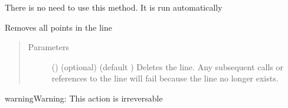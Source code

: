 \documentclass[letterpaper,10pt,english]{sphinxmanual}
\begin{document}
\begin{fulllineitems}


{\hyperref[\detokenize{pypoints:pypoints.HLine}]{}}



\begin{fulllineitems}
\label{\detokenize{pypoints:pypoints.VLine.build}}
There is no need to use this method. It is run automatically

\end{fulllineitems}


\begin{fulllineitems}
\label{\detokenize{pypoints:pypoints.VLine.remove}}
Removes all points in the line
\begin{quote}\begin{description}
\item[{Parameters}] \leavevmode
{} () \textendash{} (optional) (default ) Deletes the line. Any subsequent calls or references to the line will fail because the line no longer exists.

\end{description}\end{quote}

\begin{sphinxadmonition}{warning}{Warning:}
This action is irreversable
\end{sphinxadmonition}







\end{fulllineitems}


\end{fulllineitems}

\end{document}
